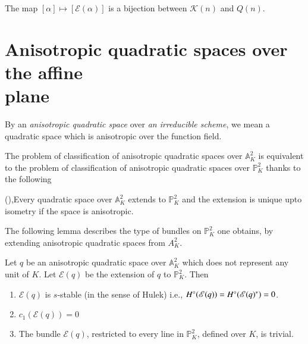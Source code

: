 \begin{thm}\label{thm1.1}
The map $[\alpha]\mapsto [\mathscr{E}(\alpha)]$ is a bijection between $\mathscr{K}(n)$ and $Q(n)$. 
\end{thm}

\section[Anisotropic quadratic spaces...]{Anisotropic quadratic spaces over the affine\texorpdfstring{\\}{eq} plane}\label{s2}

By an \textit{anisotropic quadratic space} over \textit{an irreducible scheme}, we mean a quadratic space which is anisotropic over the function field. 

The problem of classification of anisotropic quadratic spaces over $\mathbb{A}^{2}_K$ is equivalent to the problem of classification of anisotropic quadratic spaces over $\mathbb{P}^{2}_K$ thanks to the following 

\begin{thm}\label{thm2.1}
(\cite[Theorem 2.1]{key6}),\pageoriginale Every quadratic space over $\mathbb{A}^{2}_K$ extends to $\mathbb{P}^{2}_K$ and the extension is unique upto isometry if the space is anisotropic. 
\end{thm}

The following lemma describes the type of bundles on $\mathbb{P}^{2}_K$ one obtains, by extending anisotropic quadratic spaces from $A^{2}_K$. 

\begin{lem}\label{lem2.2}
Let $q$ be an anisotropic quadratic space over $\mathbb{A}^{2}_K$ which does not represent any unit of $K$. Let $\mathscr{E}(q)$ be the extension of $q$ to $\mathbb{P}^{2}_K$. Then 
\begin{enumerate}
\renewcommand{\theenumi}{\roman{enumi}}
\renewcommand{\labelenumi}{(\theenumi)}
\item $\mathscr{E}(q)$ is $s$-stable (in the sense of Hulek) i.e., $H^{\circ}(\mathscr{E}(q))\\=H^{\circ}(\mathscr{E}(q)^{\ast})=0$. 

\item $c_1(\mathscr{E}(q))=0$

\item The bundle $\mathscr{E}(q)$, restricted to every line in $\mathbb{P}^{2}_K$, defined over $K$, is trivial. 
\end{enumerate}
\end{lem}

